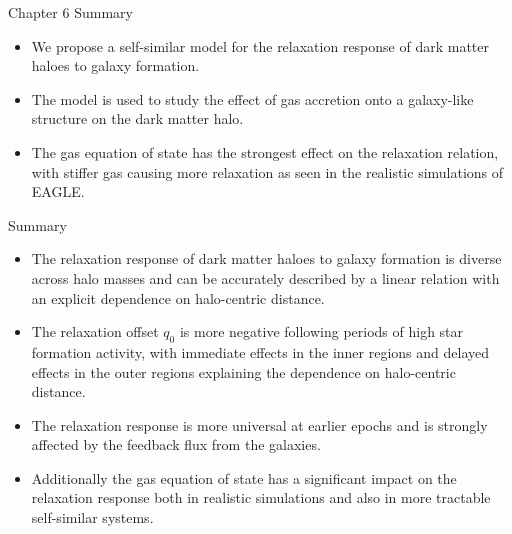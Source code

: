 \documentclass[11pt]{beamer}
\begin{document}
\begin{frame}{Chapter 6 Summary}
\begin{itemize}
\item We propose a self-similar model for the relaxation response of dark matter haloes to galaxy formation.
\item The model is used to study the effect of gas accretion onto a galaxy-like structure on the dark matter halo.
\item The gas equation of state has the strongest effect on the relaxation relation, with stiffer gas causing more relaxation as seen in the realistic simulations of EAGLE.
\end{itemize}
\end{frame}

\date[]{17 March 2025}

\begin{frame}{Summary}
    \begin{itemize}
        \item The relaxation response of dark matter haloes to galaxy formation is diverse across halo masses and can be accurately described by a linear relation with an explicit dependence on halo-centric distance.
        \item The relaxation offset $q_0$ is more negative following periods of high star formation activity, with immediate effects in the inner regions and delayed effects in the outer regions explaining the dependence on halo-centric distance.
        \item The relaxation response is more universal at earlier epochs and is strongly affected by the feedback flux from the galaxies. 
        \item Additionally the gas equation of state has a significant impact on the relaxation response both in realistic simulations and also in more tractable self-similar systems.
    \end{itemize}
\end{frame}
\end{document}
